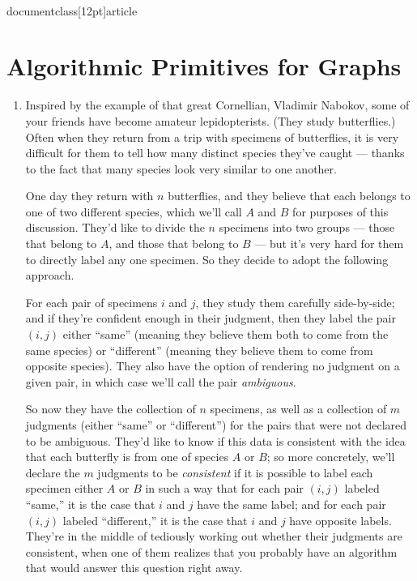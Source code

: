 \\documentclass[12pt]{article}
\begin{document}
\section{Algorithmic Primitives for Graphs}


\begin{enumerate}


\item 

Inspired by the example of that great Cornellian, Vladimir Nabokov,
some of your friends have become amateur lepidopterists.
(They study butterflies.)
Often when they return from a trip with specimens of butterflies,
it is very difficult for them to tell how many distinct species
they've caught --- thanks to the fact that many species look very similar
to one another.

One day they return with $n$ butterflies, and they believe
that each belongs to one of two different species,
which we'll call $A$ and $B$ for purposes of this discussion.
They'd like to divide the $n$ specimens into two groups ---
those that belong to $A$, and those that belong to $B$ ---
but it's very hard for them to directly label any one specimen.
So they decide to adopt the following approach.

For each pair of specimens $i$ and $j$, they study them
carefully side-by-side; and if they're confident enough
in their judgment, then they label the pair $(i,j)$
either ``same'' (meaning they believe them both to come from the
same species) or ``different'' (meaning they believe them to
come from opposite species).
They also have the option of rendering no judgment on a given
pair, in which case we'll call the pair {\em ambiguous}.

So now they have the collection of $n$ specimens, as well
as a collection of $m$ judgments (either ``same'' or ``different'')
for the pairs that were not declared to be ambiguous.
They'd like to know if this data is consistent with the
idea that each butterfly is from one of species $A$ or $B$;
so more concretely, we'll declare the $m$ judgments to be
{\em consistent} if it is possible to label each specimen either $A$ or $B$
in such a way that for each pair $(i,j)$ labeled ``same,''
it is the case that $i$ and $j$ have the same label;
and for each pair $(i,j)$ labeled ``different,''
it is the case that $i$ and $j$ have opposite labels.
They're in the middle of tediously working out whether
their judgments are consistent, when one of them realizes
that you probably have an algorithm that would answer
this question right away.


\end{enumerate}
\end{document}
